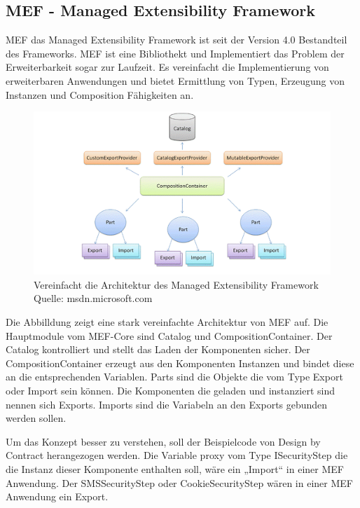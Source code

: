 \subsection{MEF - Managed Extensibility
Framework}\label{mef---managed-extensibility-framework}

MEF das Managed Extensibility Framework ist seit der Version 4.0
Bestandteil des Frameworks. MEF ist eine Bibliothekt und Implementiert
das Problem der Erweiterbarkeit sogar zur Laufzeit. Es vereinfacht die
Implementierung von erweiterbaren Anwendungen und bietet Ermittlung von
Typen, Erzeugung von Instanzen und Composition Fähigkeiten an.

\begin{figure}[htbp]
\centering
\includegraphics{images/mef_architektur.jpg}
\caption{Vereinfacht die Architektur des Managed Extensibility Framework
Quelle: msdn.microsoft.com}
\end{figure}

Die Abbilldung zeigt eine stark vereinfachte Architektur von MEF auf.
Die Hauptmodule vom MEF-Core sind Catalog und CompositionContainer. Der
Catalog kontrolliert und stellt das Laden der Komponenten sicher. Der
CompositionContainer erzeugt aus den Komponenten Instanzen und bindet
diese an die entsprechenden Variablen. Parts sind die Objekte die vom
Type Export oder Import sein können. Die Komponenten die geladen und
instanziert sind nennen sich Exports. Imports sind die Variabeln an den
Exports gebunden werden sollen.

Um das Konzept besser zu verstehen, soll der Beispielcode von Design by
Contract herangezogen werden. Die Variable proxy vom Type ISecurityStep
die die Instanz dieser Komponente enthalten soll, wäre ein „Import`` in
einer MEF Anwendung. Der SMSSecurityStep oder CookieSecurityStep wären
in einer MEF Anwendung ein Export.

